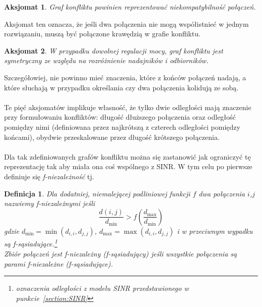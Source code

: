 \documentclass[11pt,a4paper,onecolumn,twoside]{mwart}
\newtheorem{definition}{Definicja}
\newtheorem{axiom}{Aksjomat}
\begin{document}
\begin{axiom}
    Graf konfliktu powinien reprezentować niekompatybilność połączeń.
\end{axiom}
Aksjomat ten oznacza, że jeśli dwa połączenia nie mogą współistnieć w jednym
rozwiązaniu, muszą być połączone krawędzią w grafie konfliktu.

\begin{axiom}
    W przypadku dowolnej regulacji mocy, graf konfliktu jest symetryczny ze
    względu na rozróżnienie nadajników
    i odbiorników.
\end{axiom}
Szczegółowiej, nie powinno mieć znaczenia, które z końców połączeń nadają,
a które słuchają w przypadku określania czy dwa połączenia kolidują ze sobą. \\
\\
Te pięć aksjomatów implikuje własność, że tylko dwie odległości mają znaczenie
przy formułowaniu konfliktów: długość dłuższego połączenia oraz odległość
pomiędzy nimi (definiowana przez najkrótszą z czterech odległości pomiędzy
końcami), obydwie przeskalowane przez długość krótszego połączenia. \\
\\
Dla tak zdefiniowanych grafów konfliktu można się zastanowić jak ograniczyć
tę reprezentację tak aby miała ona coś wspólnego z SINR\@. W tym celu po
pierwsze definiuje się \textit{f-niezależność} tj.\

\begin{definition}
    Dla dodatniej, niemalejącej podliniowej funkcji $f$ dwa połączenia $i$,$j$
    nazwiemy \textit{f-niezależnymi} jeśli
    $$
    \frac{d(i,j)}{d_{\min}} > f\left(\frac{d_{\max}}{d_{\min}}\right)
    $$
    gdzie $d_{\min} = \min(d_{i,i},d_{j,j})$, $d_{\max} = \max(d_{i,i},d_{j,j})$
    i w przeciwnym wypadku są \textit{f-sąsiadujące}.\footnote{oznaczenia
    odległości z modelu SINR przedstawionego w punkcie~\ref{section:SINR}} \\
    Zbiór połączeń jest \textit{f-niezależny} (\textit{f-sąsiadujący}) jeśli
    wszystkie połączenia są parami \textit{f-niezależne}
    (\textit{f-sąsiadujące}).
\end{definition}
\end{document}
